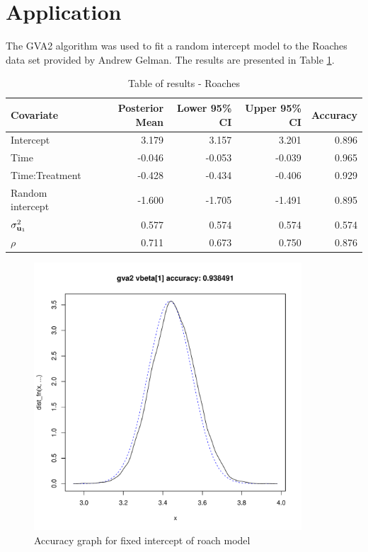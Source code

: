 \documentclass{article}[12pt]
\begin{document}
\section{Application}\label{sec:application}

The GVA2 algorithm was used to fit a random intercept model to the Roaches data set provided
by Andrew Gelman. The results are presented in Table \ref{tab:application_roaches}.



\begin{table}
\caption{Table of results - Roaches}
\label{tab:application_roaches}
\begin{tabular}{|l|rrrr|}
\hline
Covariate & Posterior Mean & Lower 95\% CI &  Upper 95\% CI & Accuracy \\
\hline
Intercept & 3.179 & 3.157 & 3.201 & 0.896 \\
Time & -0.046 & -0.053 & -0.039 & 0.965 \\
Time:Treatment & -0.428 & -0.434 & -0.406 & 0.929 \\
Random intercept & -1.600 & -1.705 & -1.491 & 0.895 \\
$\sigma^2_{{\bf u}_1}$ & 0.577 & 0.574 & 0.574 & 0.574 \\
$\rho$ & 0.711 & 0.673 & 0.750 & 0.876 \\
\hline
\end{tabular}
\end{table}

\begin{figure}
\caption{Accuracy graph for fixed intercept of roach model}
\label{fig:accuracy_roach_intercept}
\includegraphics[width=100mm, height=100mm]{code/results/1_accuracy_plots_application_gva2.pdf}
\end{figure}
\end{document}
